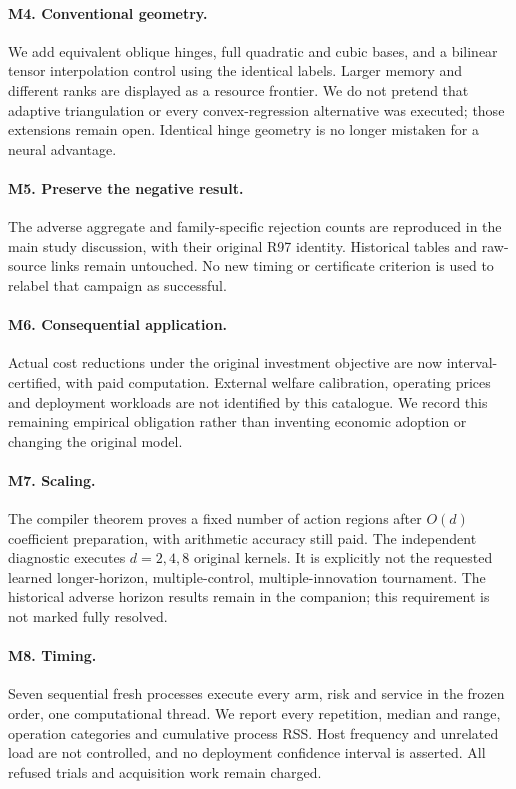 \documentclass[11pt]{article}
\begin{document}
\paragraph{M4. Conventional geometry.}
We add equivalent oblique hinges, full quadratic and cubic bases, and a bilinear tensor interpolation control using the identical labels. Larger memory and different ranks are displayed as a resource frontier. We do not pretend that adaptive triangulation or every convex-regression alternative was executed; those extensions remain open. Identical hinge geometry is no longer mistaken for a neural advantage.

\paragraph{M5. Preserve the negative result.}
The adverse aggregate and family-specific rejection counts are reproduced in the main study discussion, with their original R97 identity. Historical tables and raw-source links remain untouched. No new timing or certificate criterion is used to relabel that campaign as successful.

\paragraph{M6. Consequential application.}
Actual cost reductions under the original investment objective are now interval-certified, with paid computation. External welfare calibration, operating prices and deployment workloads are not identified by this catalogue. We record this remaining empirical obligation rather than inventing economic adoption or changing the original model.

\paragraph{M7. Scaling.}
The compiler theorem proves a fixed number of action regions after $O(d)$ coefficient preparation, with arithmetic accuracy still paid. The independent diagnostic executes $d=2,4,8$ original kernels. It is explicitly not the requested learned longer-horizon, multiple-control, multiple-innovation tournament. The historical adverse horizon results remain in the companion; this requirement is not marked fully resolved.

\paragraph{M8. Timing.}
Seven sequential fresh processes execute every arm, risk and service in the frozen order, one computational thread. We report every repetition, median and range, operation categories and cumulative process RSS. Host frequency and unrelated load are not controlled, and no deployment confidence interval is asserted. All refused trials and acquisition work remain charged.
\end{document}
